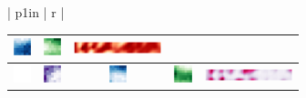 \documentclass[landscape,paperwidth=46truein,paperheight=41truein,fontscale=0.3]{baposter}
\begin{document}
\begin{poster}
{\begin{center}
\begin{minipage}{0.98 \columnwidth}
\begin{multicols}{3}
\begin{center}
{\begin{tabular}{| p{1in} | r |}
\begin{tabular}{c c c c | c}
					\includegraphics[height=0.2in]{../../../../src/python/minnd/model_plt/img_3_1_2_1} &
					\includegraphics[height=0.2in]{../../../../src/python/minnd/model_plt/img_3_1_2_2} & \includegraphics[width=1in]{../../../../src/python/minnd/model_plt/img_3_2_2_0} \\ \hline
					\includegraphics[height=0.2in]{../../../../src/python/minnd/model_plt/img_w} &
					\includegraphics[height=0.2in]{../../../../src/python/minnd/model_plt/img_3_1_3_0} &
					\includegraphics[height=0.2in]{../../../../src/python/minnd/model_plt/img_3_1_3_1} &
					\includegraphics[height=0.2in]{../../../../src/python/minnd/model_plt/img_3_1_3_2} & \includegraphics[width=1in]{../../../../src/python/minnd/model_plt/img_3_2_3_0} \\
				 \end{tabular} \\ \hline
				 

\end{tabular}}
\end{center}
\end{multicols}
\end{minipage}
\end{center}}
\end{poster}
\end{document}
